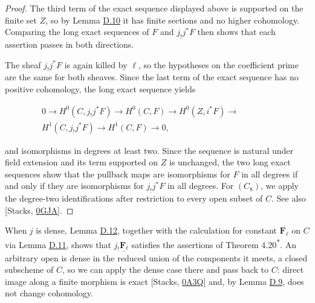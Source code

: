 \documentclass[11pt]{article}
\newcommand{\bpout}[1]{#1\textsuperscript{\hyperlink{bp-outside}{\ensuremath{\ast}}}}
\begin{document}
\begin{proof}[{Proof}]\label{bp42}%
The third term of the exact sequence displayed above is supported on the finite set \(Z\), so by Lemma \hyperref[bp33]{D.10} it has finite sections and no higher cohomology. Comparing the long exact sequences of \(F\) and \(j_!j^*F\) then shows that each assertion passes in both directions.

The sheaf \(j_!j^*F\) is again killed by \(\ell\), so the hypotheses on the coefficient prime are the same for both sheaves. Since the last term of the exact sequence has no positive cohomology, the long exact sequence yields

\[
\begin{split}
0\to H^0(C,j_!j^*F)\to H^0(C,F)\to H^0(Z,i^*F)\to{}\qquad\qquad\\
H^1(C,j_!j^*F)\to H^1(C,F)\to0,
\end{split}
\]

and isomorphisms in degrees at least two. Since the sequence is natural under field extension and its term supported on \(Z\) is unchanged, the two long exact sequences show that the pullback maps are isomorphisms for \(F\) in all degrees if and only if they are isomorphisms for \(j_!j^*F\) in all degrees. For \((C_8)\), we apply the degree-two identifications after restriction to every open subset of \(C\). See also [Stacks, \href{https://stacks.math.columbia.edu/tag/0GJA}{0GJA}].
\end{proof}

\label{bp43}%
When \(j\) is dense, Lemma \hyperref[bp41]{D.12}, together with the calculation for constant \(\mathbf F_\ell\) on \(C\) via Lemma \hyperref[bp36]{D.11}, shows that \(j_!\underline{\mathbf F_\ell}\) satisfies the assertions of Theorem \bpout{4.20}. An arbitrary open is dense in the reduced union of the components it meets, a closed subscheme of \(C\), so we can apply the dense case there and pass back to \(C\): direct image along a finite morphism is exact [Stacks, \href{https://stacks.math.columbia.edu/tag/0A3Q}{0A3Q}] and, by Lemma \hyperref[bp30]{D.9}, does not change cohomology.


\end{document}
